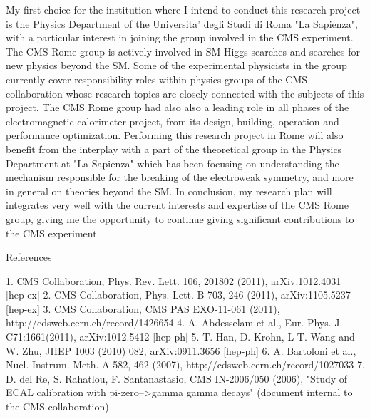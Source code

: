 \documentclass[10pt, a4paper]{article}
\begin{document}
My first choice for the institution where I intend to conduct this research project is the Physics Department of the Universita' degli Studi di Roma "La Sapienza", with a particular interest in joining the group involved in the CMS experiment. 
The CMS Rome group is actively involved in SM Higgs searches and searches for new physics beyond the SM. Some of the experimental physicists in the group currently cover responsibility roles within physics groups of the CMS collaboration whose research topics are closely connected with the subjects of this project. The CMS Rome group had also also a leading role in all phases of the electromagnetic calorimeter project, from its design, building, operation and performance optimization.
Performing this research project in Rome will also benefit from the interplay with a part of the theoretical group in the Physics Department at "La Sapienza" which has been focusing on understanding the mechanism responsible for the breaking of the electroweak symmetry, and more in general on theories beyond the SM.
In conclusion, my research plan will integrates very well with the current interests and expertise of the CMS Rome group, giving me the opportunity to continue giving significant contributions to the CMS experiment. 


References

1. CMS Collaboration, Phys. Rev. Lett. 106, 201802 (2011), arXiv:1012.4031 [hep-ex]  
2. CMS Collaboration, Phys. Lett. B 703, 246 (2011), arXiv:1105.5237 [hep-ex] 
3. CMS Collaboration, CMS PAS EXO-11-061 (2011), http://cdsweb.cern.ch/record/1426654   
4. A. Abdesselam et al., Eur. Phys. J. C71:1661(2011), arXiv:1012.5412 [hep-ph] 
5. T. Han, D. Krohn, L-T. Wang and W. Zhu, JHEP 1003 (2010) 082, arXiv:0911.3656 [hep-ph] 
6. A. Bartoloni et al., Nucl. Instrum. Meth. A 582, 462 (2007), http://cdsweb.cern.ch/record/1027033 
7. D. del Re, S. Rahatlou, F. Santanastasio,  CMS IN-2006/050 (2006), "Study of ECAL calibration with pi-zero-->gamma gamma decays"  (document internal to the CMS collaboration)


\end{document}
